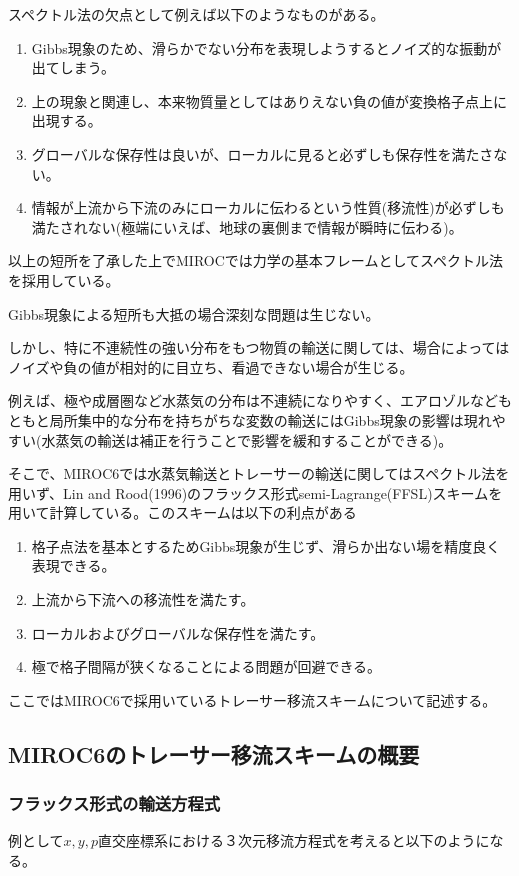 \documentclass{jsbook}
\begin{document}
スペクトル法の欠点として例えば以下のようなものがある。
\begin{enumerate}
\item Gibbs現象のため、滑らかでない分布を表現しようするとノイズ的な振動が出てしまう。
\item 上の現象と関連し、本来物質量としてはありえない負の値が変換格子点上に出現する。
\item グローバルな保存性は良いが、ローカルに見ると必ずしも保存性を満たさない。
\item 情報が上流から下流のみにローカルに伝わるという性質(移流性)が必ずしも満たされない(極端にいえば、地球の裏側まで情報が瞬時に伝わる)。
\end{enumerate}
以上の短所を了承した上でMIROCでは力学の基本フレームとしてスペクトル法を採用している。

Gibbs現象による短所も大抵の場合深刻な問題は生じない。

しかし、特に不連続性の強い分布をもつ物質の輸送に関しては、場合によってはノイズや負の値が相対的に目立ち、看過できない場合が生じる。

例えば、極や成層圏など水蒸気の分布は不連続になりやすく、エアロゾルなどもともと局所集中的な分布を持ちがちな変数の輸送にはGibbs現象の影響は現れやすい(水蒸気の輸送は補正を行うことで影響を緩和することができる)。

そこで、MIROC6では水蒸気輸送とトレーサーの輸送に関してはスペクトル法を用いず、Lin and Rood(1996)のフラックス形式semi-Lagrange(FFSL)スキームを用いて計算している。このスキームは以下の利点がある
\begin{enumerate}
\item 格子点法を基本とするためGibbs現象が生じず、滑らか出ない場を精度良く表現できる。
\item 上流から下流への移流性を満たす。
\item ローカルおよびグローバルな保存性を満たす。
\item 極で格子間隔が狭くなることによる問題が回避できる。
\end{enumerate}
ここではMIROC6で採用いているトレーサー移流スキームについて記述する。

\subsection{MIROC6のトレーサー移流スキームの概要}
\subsubsection{フラックス形式の輸送方程式}
例として$x,y,p$直交座標系における３次元移流方程式を考えると以下のようになる。
\end{document}
